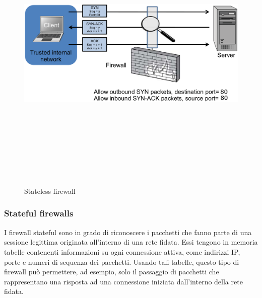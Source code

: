 \begin{figure}[htbp]
	\centering%
	\subfigure%
	{\includegraphics[height=13cm, width=13cm, keepaspectratio]{Immagini/firewalls/stateless_firewall.png}}
	\caption{Stateless firewall \label{fig:stateless_firewall}} 	
\end{figure}

\subsubsection{Stateful firewalls}
I firewall stateful sono in grado di riconoscere i pacchetti che fanno parte di una sessione legittima originata all'interno di una rete fidata. Essi tengono in memoria tabelle contenenti informazioni su ogni connessione attiva, come indirizzi IP, porte e numeri di sequenza dei pacchetti. Usando tali tabelle, questo tipo di firewall può permettere, ad esempio, solo il passaggio di pacchetti che rappresentano una risposta ad una connessione iniziata dall'interno della rete fidata.

